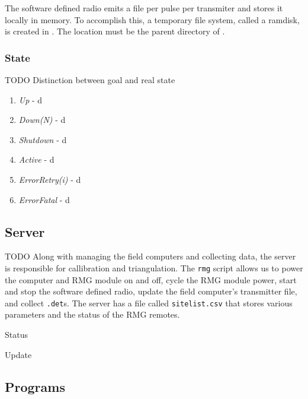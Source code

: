 \documentclass[letter]{article}
\begin{document}
The software defined radio emits a file per pulse per transmiter and stores it 
locally in memory. To accomplish this, a temporary file system, called a ramdisk, 
is created in . The location must be the parent directory 
of . 

\subsubsection{State} TODO
Distinction between goal and real state

\begin{enumerate}
  \item \textit{Up} - d
  \item \textit{Down(N)} - d
  \item \textit{Shutdown} - d
  \item \textit{Active} - d
  \item \textit{ErrorRetry(i)} - d
  \item \textit{ErrorFatal} - d
\end{enumerate}


\subsection{Server} TODO
Along with managing the field computers and collecting data, the server is responsible for
callibration and triangulation. The \texttt{rmg} script allows us to power the computer and 
RMG module on and off, cycle the RMG module power, start and stop the software defined radio, 
update the field computer's transmitter file, and collect \texttt{.det}s. The server has a 
file called \texttt{sitelist.csv} that stores various parameters and the status of the RMG remotes.

Status

Update




\subsection{Programs}
\end{document}

